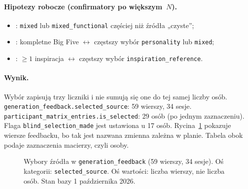 \paragraph{Hipotezy robocze (confirmatory po większym~$N$).}
\begin{itemize}
  \item {}: \texttt{mixed} lub \texttt{mixed\_functional} częściej niż źródła „czyste”;
  \item {}: kompletne Big Five $\leftrightarrow$ częstszy wybór \texttt{personality} lub \texttt{mixed};
  \item {}: $\geq 1$ inspiracja $\leftrightarrow$ częstszy wybór \texttt{inspiration\_reference}.
\end{itemize}

\paragraph{Wynik.}
Wybór zapisują trzy liczniki i nie sumują się one do tej samej liczby osób. \texttt{generation\_feedback.selected\_source}: 59 wierszy, 34 sesje. \texttt{participant\_matrix\_entries.is\_selected}: 29 osób (po jednym zaznaczeniu). Flaga \texttt{blind\_selection\_made} jest ustawiona u 17 osób. Rycina~\ref{fig:ch08:selected-source} pokazuje wiersze feedbacku, bo tak jest nazwana zmienna zależna w planie. Tabela obok podaje zaznaczenia macierzy, czyli osoby.

\begin{figure}[htbp]
  \centering
  \caption{Wybory źródła w \texttt{generation\_feedback} (59 wierszy, 34 sesje). Oś kategorii: \texttt{selected\_source}. Oś wartości: liczba wierszy, nie liczba osób. Stan bazy 1 października 2026.}
  \label{fig:ch08:selected-source}
\end{figure}

